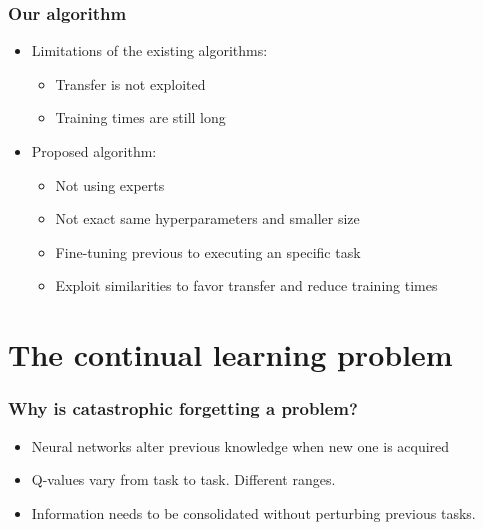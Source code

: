 \documentclass{beamer}
\theoremstyle{remark}
\theoremstyle{plain}
\begin{document}
\begin{frame}
\frametitle{Our algorithm}
\begin{itemize}
    \item Limitations of the existing algorithms:
    \begin{itemize}
        \item Transfer is not exploited
        \item Training times are still long
    \end{itemize}
\item Proposed algorithm:
        \begin{itemize}
            \item Not using experts
            \item Not exact same hyperparameters and smaller size
            \item Fine-tuning previous to executing an specific task
            \item Exploit similarities to favor transfer and reduce training times
        \end{itemize}
\end{itemize}
    
\end{frame}
\section{The continual learning problem}
\label{sec:continual}

\begin{frame}
 \frametitle{Why is catastrophic forgetting a problem?}
  \begin{itemize}
      \item Neural networks alter previous knowledge when new one is acquired
      \item Q-values vary from task to task. Different ranges.
      \item Information needs to be consolidated without perturbing previous tasks.
  \end{itemize}
\end{frame}
\end{document}
